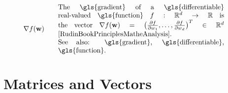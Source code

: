\begin{align}
	 &\nabla f(\weights) & \quad & \parbox{.70\textwidth}{The \gls{gradient} of a \gls{differentiable} real-valued \gls{function} 
	 	$f: \mathbb{R}^{\featuredim}\rightarrow \mathbb{R}$ is the vector 
	 	$\nabla f(\weights) = \big( \frac{\partial f}{\partial \weight_{1}},\ldots,\frac{\partial f}{\partial \weight_{\featuredim}}  \big)^{T} \in \mathbb{R}^{\featuredim}$ \cite[Ch. 9]{RudinBookPrinciplesMatheAnalysis}.
		\\ See also: \gls{gradient}, \gls{differentiable}, \gls{function}.}   \nonumber
\end{align} 
\section*{Matrices and Vectors} 

